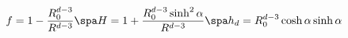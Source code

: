 \begin{equation}
\label{fandH}
f = 1 - \frac{R_0^{d-3}}{R^{d-3}}
\spa
H = 1 + \frac{R_0^{d-3} \sinh^2 \alpha}{R^{d-3}}
\spa h_d = R_0^{d-3} \cosh \alpha \sinh \alpha
\end{equation}

